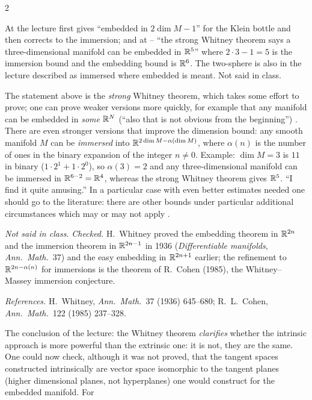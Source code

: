 \begin{paracol}{2}
\begin{coursenote}
At  the lecture first gives ``embedded in $2\dim M-1$'' for the Klein bottle and then corrects to the immersion; and at -- ``the strong Whitney theorem says a three-dimensional manifold can be embedded in $\mathbb{R}^5$'' where $2\cdot3-1=5$ is the immersion bound and the embedding bound is $\mathbb{R}^6$. The two-sphere is also in the lecture
described as immersed where embedded is meant. Not said in class.
\end{coursenote}
\begin{secondary}
The statement above is the \emph{strong} Whitney theorem, which takes some effort to prove; one can prove weaker versions more quickly, for example that any manifold can be embedded in \emph{some} $\mathbb{R}^N$ (``also that is not obvious from the beginning'')   .
There are even stronger versions that improve the dimension bound: any smooth manifold $M$ can be \emph{immersed} into $\mathbb{R}^{2\dim M-\alpha(\dim M)}$, where $\alpha(n)$ is the number of ones in the binary expansion of the integer $n\ne0$. Example: $\dim M=3$ is $11$ in binary ($1\cdot2^1+1\cdot2^0$), so $\alpha(3)=2$ and any three-dimensional manifold can be immersed in $\mathbb{R}^{6-2}=\mathbb{R}^4$,
whereas the strong Whitney theorem gives $\mathbb{R}^5$. ``I find it quite amusing.'' In a particular case with even better estimates needed one should go to the literature: there are other bounds under particular additional circumstances which may or may not apply
     .
\end{secondary}
\begin{history}
\emph{Not said in class.} \emph{Checked.} H.~Whitney proved the embedding theorem in $\mathbb{R}^{2n}$ and the immersion theorem in $\mathbb{R}^{2n-1}$ in 1936 (\emph{Differentiable manifolds}, \emph{Ann.\ Math.}\ 37) and the easy embedding in $\mathbb{R}^{2n+1}$ earlier; the refinement to $\mathbb{R}^{2n-\alpha(n)}$ for immersions is the theorem of R.~Cohen (1985), the Whitney--Massey
immersion conjecture.\par
\emph{References.} H.~Whitney, \emph{Ann.\ Math.}\ 37 (1936) 645--680; R.~L.~Cohen, \emph{Ann.\ Math.}\ 122 (1985) 237--328.
\end{history}
The conclusion of the lecture: the Whitney theorem \emph{clarifies} whether the intrinsic approach is more powerful than the extrinsic one: it is not, they are the same. One could now check, although it was not proved, that the tangent spaces constructed intrinsically are vector space isomorphic to the tangent planes (higher dimensional planes, not hyperplanes) one would construct for the embedded manifold. For

\end{paracol}
